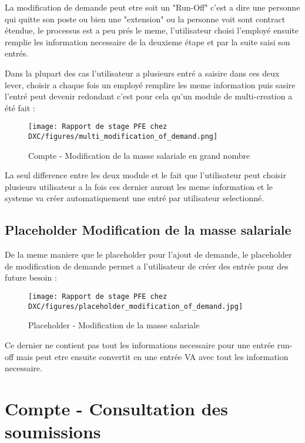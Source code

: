 La modification de demande peut etre soit un "Run-Off" c'est a dire une personne qui quitte son poste ou bien une "extension" ou la personne voit sont contract étendue, le processus est a peu prés le meme, l'utilisateur choisi l'employé ensuite remplie les information necessaire de la deuxieme étape et par la suite saisi son entrés.

\newpage

Dans la plupart des cas l'utilisateur a plusieurs entré a saisire dans ces deux lever, choisir a chaque fois un employé remplire les meme information puis sasire l'entré peut devenir redondant c'est pour cela qu'un module de multi-creation a été fait :

\begin{figure}[H]
    \centering
    \texttt{[image: Rapport de stage PFE chez DXC/figures/multi\_modification\_of\_demand.png]}
    \caption{Compte - Modification de la masse salariale en grand nombre}
\end{figure}

La seul difference entre les deux module et le fait que l'utilisateur peut choisir plusieurs utilisateur a la fois ces dernier auront les meme information et le systeme va créer automatiquement une entré par utilisateur selectionné.

\newpage

\subsection{Placeholder Modification de la masse salariale}

De la meme maniere que le placeholder pour l'ajout de demande, le placeholder de modification de demande permet a l'utilisateur de créer des entrée pour des future besoin :

\begin{figure}[H]
    \centering
    \texttt{[image: Rapport de stage PFE chez DXC/figures/placeholder\_modification\_of\_demand.jpg]}
    \caption{Placeholder - Modification de la masse salariale}
\end{figure}

Ce dernier ne contient pas tout les informations necessaire pour une entrée run-off mais peut etre ensuite convertit en une entrée VA avec tout les information necessaire.

\newpage
\section{Compte - Consultation des soumissions}

